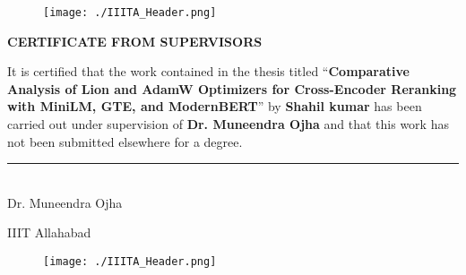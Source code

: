 \checktoopen
\begin{figure}[htp]
    \texttt{[image: ./IIITA\_Header.png]}
\end{figure}
\thispagestyle{empty}
\vspace*{.06\textheight}

\begin{spacing}{1.5}
\begin{center}
    {\centering\large\bfseries CERTIFICATE FROM SUPERVISORS\par\vspace{10pt}}
\end{center}

\noindent It is certified that the work contained in the thesis titled \enquote{\textbf{Comparative Analysis of Lion and AdamW
Optimizers for Cross-Encoder Reranking with MiniLM, GTE, and ModernBERT}} by \textbf{Shahil kumar} has been carried out under supervision of \textbf{Dr. Muneendra Ojha} and that this work has not been submitted elsewhere for a degree.

\vspace{3.5cm}

\hfill\begin{minipage}{7.5cm}
    \begin{spacing}{1.2}
        \par
        \rule{\textwidth}{0.2pt}\\
        {Dr. Muneendra Ojha} \par
        {\deptname}  \par
        IIIT Allahabad \par
    \end{spacing}
\end{minipage}


\end{spacing}
\cleardoublepage

\begin{figure}[htp]
    \texttt{[image: ./IIITA\_Header.png]}
\end{figure}
\thispagestyle{empty}
\vspace*{.06\textheight}

